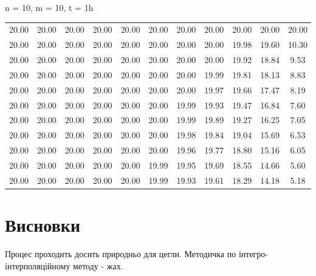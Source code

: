 \documentclass[fontsize=14pt,DIV=1,a4paper]{scrartcl}
\begin{document}
	\newpage
	
    \vspace{10px}
    n = 10, m = 10, t = 1h
    \vspace{10px}

    \begin{tabular}{c c c c c c c c c c c}
	  20.00&  20.00&  20.00&  20.00&  20.00&  20.00&  20.00&  20.00&  20.00&  20.00&  20.00 \\
	  20.00&  20.00&  20.00&  20.00&  20.00&  20.00&  20.00&  20.00&  19.98&  19.60&  10.30 \\
	  20.00&  20.00&  20.00&  20.00&  20.00&  20.00&  20.00&  20.00&  19.92&  18.84&   9.53 \\
	  20.00&  20.00&  20.00&  20.00&  20.00&  20.00&  20.00&  19.99&  19.81&  18.13&   8.83 \\
	  20.00&  20.00&  20.00&  20.00&  20.00&  20.00&  20.00&  19.97&  19.66&  17.47&   8.19 \\
	  20.00&  20.00&  20.00&  20.00&  20.00&  20.00&  19.99&  19.93&  19.47&  16.84&   7.60 \\
	  20.00&  20.00&  20.00&  20.00&  20.00&  20.00&  19.99&  19.89&  19.27&  16.25&   7.05 \\
	  20.00&  20.00&  20.00&  20.00&  20.00&  20.00&  19.98&  19.84&  19.04&  15.69&   6.53 \\
	  20.00&  20.00&  20.00&  20.00&  20.00&  20.00&  19.96&  19.77&  18.80&  15.16&   6.05 \\
	  20.00&  20.00&  20.00&  20.00&  20.00&  19.99&  19.95&  19.69&  18.55&  14.66&   5.60 \\
	  20.00&  20.00&  20.00&  20.00&  20.00&  19.99&  19.93&  19.61&  18.29&  14.18&   5.18 \\
    \end{tabular}
	
	\newpage
	\section*{Висновки}
	
	Процес проходить досить природньо для цегли. Методичка по інтегро-інтерполяційному методу - жах.
\end{document}
